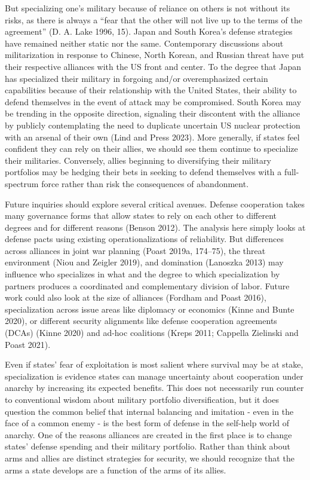 \documentclass[
  12,
  letterpaper,
  DIV=11,
  numbers=noendperiod]{scrartcl}
\begin{document}
But specializing one's military because of reliance on others is not
without its risks, as there is always a ``fear that the other will not
live up to the terms of the agreement'' (D. A. Lake 1996, 15). Japan and
South Korea's defense strategies have remained neither static nor the
same. Contemporary discussions about militarization in response to
Chinese, North Korean, and Russian threat have put their respective
alliances with the US front and center. To the degree that Japan has
specialized their military in forgoing and/or overemphasized certain
capabilities because of their relationship with the United States, their
ability to defend themselves in the event of attack may be compromised.
South Korea may be trending in the opposite direction, signaling their
discontent with the alliance by publicly contemplating the need to
duplicate uncertain US nuclear protection with an arsenal of their own
(Lind and Press 2023). More generally, if states feel confident they can
rely on their allies, we should see them continue to specialize their
militaries. Conversely, allies beginning to diversifying their military
portfolios may be hedging their bets in seeking to defend themselves
with a full-spectrum force rather than risk the consequences of
abandonment.

Future inquiries should explore several critical avenues. Defense
cooperation takes many governance forms that allow states to rely on
each other to different degrees and for different reasons (Benson 2012).
The analysis here simply looks at defense pacts using existing
operationalizations of reliability. But differences across alliances in
joint war planning (Poast 2019a, 174--75), the threat environment (Niou
and Zeigler 2019), and domination (Lanoszka 2013) may influence who
specializes in what and the degree to which specialization by partners
produces a coordinated and complementary division of labor. Future work
could also look at the size of alliances (Fordham and Poast 2016),
specialization across issue areas like diplomacy or economics (Kinne and
Bunte 2020), or different security alignments like defense cooperation
agreements (DCAs) (Kinne 2020) and ad-hoc coalitions (Kreps 2011;
Cappella Zielinski and Poast 2021).

Even if states' fear of exploitation is most salient where survival may
be at stake, specialization is evidence states can manage uncertainty
about cooperation under anarchy by increasing its expected benefits.
This does not necessarily run counter to conventional wisdom about
military portfolio diversification, but it does question the common
belief that internal balancing and imitation - even in the face of a
common enemy - is the best form of defense in the self-help world of
anarchy. One of the reasons alliances are created in the first place is
to change states' defense spending and their military portfolio. Rather
than think about arms and allies are distinct strategies for security,
we should recognize that the arms a state develops are a function of the
arms of its allies.
\end{document}
